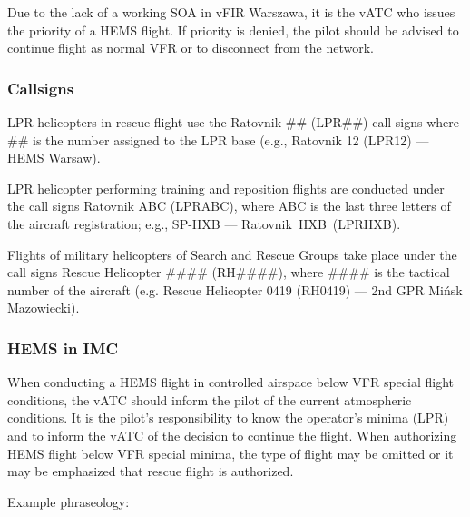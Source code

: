 Due to the lack of a working SOA in vFIR Warszawa, it is the vATC who issues the priority of a HEMS flight. If priority is denied, the pilot should be advised to continue flight as normal VFR or to disconnect from the network.

\subsubsection{Callsigns}
LPR helicopters in rescue flight use the Ratovnik \#\# (LPR\#\#) call signs where \#\# is the number assigned to the LPR base (e.g., Ratovnik 12 (LPR12) --- HEMS Warsaw).

LPR helicopter performing training and reposition flights are conducted under the call signs Ratovnik ABC (LPRABC), where ABC is the last three letters of the aircraft registration; e.g., SP-HXB --- Ratovnik~HXB~(LPRHXB).

Flights of military helicopters of Search and Rescue Groups take place under the call signs Rescue Helicopter \#\#\#\# (RH\#\#\#\#), where \#\#\#\# is the tactical number of the aircraft (e.g. Rescue Helicopter 0419 (RH0419) --- 2nd GPR Mińsk Mazowiecki).

\subsubsection{HEMS in IMC}
When conducting a HEMS flight in controlled airspace below VFR special flight conditions, the vATC should inform the pilot of the current atmospheric conditions. It is the pilot's responsibility to know the operator's minima (LPR) and to inform the vATC of the decision to continue the flight. When authorizing HEMS flight below VFR special minima, the type of flight may be omitted or it may be emphasized that rescue flight is authorized.

Example phraseology:


